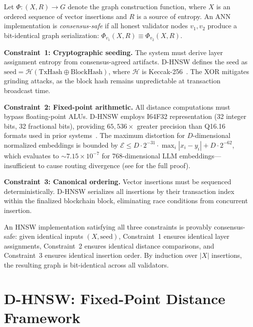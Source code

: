 \documentclass[10pt,journal,compsoc]{IEEEtran}
\newcommand{\dhnsw}{\textsc{D-HNSW}}
\newcommand{\hnsw}{\textsc{HNSW}}
\begin{document}
Let $\Phi: (X, R) \rightarrow G$ denote the graph construction function, where $X$ is an ordered sequence of vector insertions and $R$ is a source of entropy. An ANN implementation is \emph{consensus-safe} if all honest validator nodes $v_1, v_2$ produce a bit-identical graph serialization: $\Phi_{v_1}(X, R) \equiv \Phi_{v_2}(X, R)$.

\textbf{Constraint~1: Cryptographic seeding.} The system must derive layer assignment entropy from consensus-agreed artifacts. \dhnsw{} defines the seed as $\text{seed} = \mathcal{H}(\text{TxHash} \oplus \text{BlockHash})$, where $\mathcal{H}$ is Keccak-256~\cite{bertoni2013keccak}. The XOR mitigates grinding attacks, as the block hash remains unpredictable at transaction broadcast time.

\textbf{Constraint~2: Fixed-point arithmetic.} All distance computations must bypass floating-point ALUs. \dhnsw{} employs I64F32 representation (32 integer bits, 32 fractional bits), providing $65{,}536\times$ greater precision than Q16.16 formats used in prior systems~\cite{gudur2025valori}. The maximum distortion for $D$-dimensional normalized embeddings is bounded by $\mathcal{E} \leq D \cdot 2^{-31} \cdot \max_i |x_i - y_i| + D \cdot 2^{-62}$, which evaluates to $\sim 7.15 \times 10^{-7}$ for 768-dimensional LLM embeddings---insufficient to cause routing divergence (see  for the full proof).

\textbf{Constraint~3: Canonical ordering.} Vector insertions must be sequenced deterministically. \dhnsw{} serializes all insertions by their transaction index within the finalized blockchain block, eliminating race conditions from concurrent insertion.

An \hnsw{} implementation satisfying all three constraints is provably consensus-safe: given identical inputs $(X, \text{seed})$, Constraint~1 ensures identical layer assignments, Constraint~2 ensures identical distance comparisons, and Constraint~3 ensures identical insertion order. By induction over $|X|$ insertions, the resulting graph is bit-identical across all validators.


\section{D-HNSW: Fixed-Point Distance Framework}
\label{sec:method}
\end{document}

